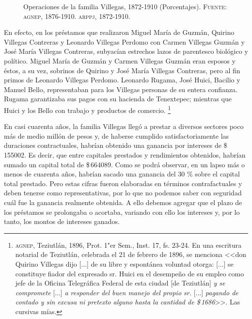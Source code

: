 \documentclass[14pt,twoside,final]{extbook} %
\let\oldfootnote\footnote
\renewcommand\footnote[1]{%
\oldfootnote{\hspace{1mm}#1}}
\begin{document}
\begin{figure}
\centering
{}
\caption[Operaciones de la familia Villegas, 1872-1910 (Porcentajes)]{Operaciones de la familia Villegas, 1872-1910 (Porcentajes). \textsc{Fuente:} \textsc{agnep}, 1876-1910. \textsc{arppj}, 1872-1910.}
\label{fig:porcentajes}
\end{figure}

En efecto, en los préstamos que realizaron Miguel María de Guzmán, Quirino Villegas Contreras y Leonardo Villegas Perdomo con Carmen Villegas Guzmán y José María Villegas Contreras, subyacían estrechos lazos de parentesco biológico y político. Miguel María de Guzmán y Carmen Villegas Guzmán eran esposos y éstos, a su vez, sobrinos de Quirino y José María Villegas Contreras, pero al fin primos de Leonardo Villegas Perdomo. Leonardo Rugama, José Huici, Bacilio y Manuel Bello, representaban para los Villegas personas de su entera confianza. Rugama garantizaba sus pagos con su
hacienda de Tenextepec; mientras que Huici y los Bello con trabajo y productos de comercio.\footnote{\textsc{agnep}, Teziutlán, 1896, Prot. 1"er Sem., Inst. 17, fs. 23-24. En una escritura notarial de Teziutlán, celebrada el 21 de febrero de 1896, se menciona <<don Quirino Villegas dijo [...] de su libre y espontánea voluntad otorga: [...] se constituye fiador del expresado sr. Huici en el desempeño de su empleo como jefe de la Oficina Telegráfica Federal de esta ciudad [de Teziutlán] \emph{y se compromete} [...] \emph{a responder del buen manejo del propio sr.} [...] \emph{pagando de contado y sin excusa ni pretexto alguno hasta la cantidad de \$\,1686}>>. Las cursivas mías.}

En casi cuarenta años, la familia Villegas llegó a prestar a diversos sectores poco más de medio millón de pesos y, de haberse cumplido satisfactoriamente las duraciones contractuales, habrían obtenido una ganancia por intereses de \$\,155002. Es decir, que entre capitales prestados y rendimientos obtenidos, habrían sumado un capital total de \$\,664089. Como se podrá observar, en un lapso más o menos de cuarenta años, habrían sacado una ganancia del 30 \% sobre el capital total prestado. Pero estas cifras fueron elaboradas en términos contrafactuales y deben tenerse como representativas, por lo que no podemos saber con seguridad cuál fue la ganancia realmente obtenida. A
ello debemos agregar que el plazo de los préstamos se prolongaba o acortaba, variando con ello los intereses y, por lo tanto, los montos de intereses ganados.
\end{document}
